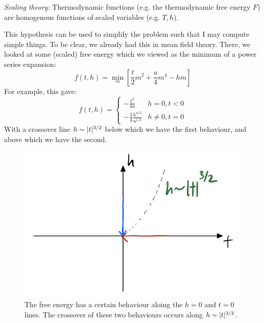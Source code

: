 \emph{Scaling theory:} Thermodynamic functions (e.g. the thermodynamic free energy $F$) are homogenous functions of scaled variables (e.g. $T, h$).

This hypothesis can be used to simplify the problem such that I may compute simple things. To be clear, we already had this in mean field theory. There, we looked at some (scaled) free energy which we viewed as the minimum of a power series expansion:
\begin{equation}
    f(t, h) = \min_m \left[\frac{t}{2}m^2 + \frac{u}{4}m^4 - hm\right]
\end{equation}
For example, this gave:
\begin{equation}
    f(t, h) = \begin{cases}
        -\frac{t^2}{4u} & h = 0, t < 0
        \\ -\frac{3}{4}\frac{h^{4/3}}{u^{1/3}} & h \neq 0, t = 0
    \end{cases}
\end{equation}
With a crossover line $h \sim \lvert t \rvert^{3/2}$ below which we have the first behaviour, and above which we have the second.

\begin{figure}[htbp]
    \centering
    \includegraphics[scale=0.5]{Lectures/Figures/htcrossover.png}
    \caption{The free energy has a certain behaviour aloing the $h = 0$ and $t = 0$ lines. The crossover of these two behaviours occurs along $h \sim \lvert t \rvert^{3/2}$.}
    \label{fig-htcrossover}
\end{figure}

